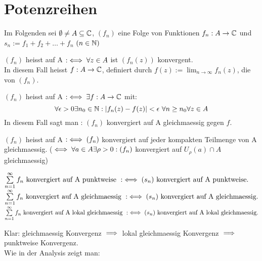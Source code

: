 \documentclass[a4paper,twoside,DIV15,BCOR12mm]{scrbook}
\def\gdw{\equizu}
\def\gdw{\equizu}
\begin{document}
\chapter{Potenzreihen}
Im Folgenden sei $\emptyset \ne A \subseteq \mathbb{C}$, $(f_n)$ eine Folge von Funktionen $f_n:A\to\mathbb{C}$  und $s_n:=f_1+f_2+\dots+f_n$ $(n\in \mathbb{N})$\\
\begin{definition}
\begin{liste}
\item $(f_n)$ heisst auf A  $:\gdw \forall z \in A$ ist $(f_n(z))$ konvergent.\\
  In diesem Fall heisst $f:A\to\mathbb{C}$, definiert durch $f(z):=\lim_{n\to\infty} f_n(z)$, die  von $(f_n)$.
\item $(f_n)$ heisst auf A  $:\gdw \exists f:A\to\MdC$ mit:
  $$ \forall \epsilon > 0 \exists n_0 \in \mathbb{N}: |f_n(z)-f(z)|<\epsilon \ \forall n \geq n_0 \forall z \in A $$
  In diesem Fall sagt man : $(f_n)$ konvergiert auf A gleichmaessig gegen $f$.
\item $(f_n)$ heisst auf A  $:\gdw (f_n)$ konvergiert auf jeder kompakten Teilmenge von A gleichmaessig. ($\gdw\forall a\in A\exists\rho>0:(f_n)$ konvergiert auf $U_\rho(a)\cap A$ gleichmaessig)
\item $ \sum\limits_{n=1}^\infty f_n \text{ konvergiert auf A punktweise } :\gdw (s_n) \text{ konvergiert auf A punktweise.}$\\
  $ \sum\limits_{n=1}^\infty f_n \text{ konvergiert auf A gleichmaessig } :\gdw (s_n) \text{ konvergiert auf A gleichmaessig.}$\\
  $ \sum\limits_{n=1}^\infty f_n \text{ konvergiert auf A lokal gleichmaessig } :\gdw (s_n) \text{ konvergiert auf A lokal gleichmaessig.}$\\
 
\end{liste}

\end{definition}
Klar: gleichmaessig Konvergenz $\implies$ lokal gleichmaessig Konvergenz $\implies$ punktweise Konvergenz.\\
Wie in der Analysis zeigt man:\\
\end{document}
